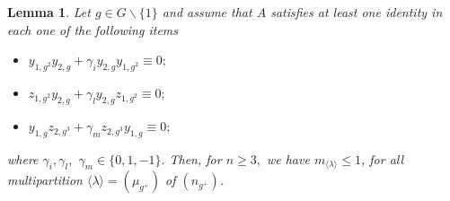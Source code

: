 \documentclass{amsart}
\newtheorem{lema}[teorema]{Lemma}
\numberwithin{equation}{section}
\begin{document}
\begin{lema}\label{lema2F} 
 Let $g\in G\backslash \{1\}$  and assume that $A$ satisfies at least one identity in each one of the following items
	\begin{itemize}
		\item[1)]$y_{1,g^2}y_{2,g}+\gamma_{i} y_{2,g}y_{1,g^2}\equiv 0;$
		
		\item[2)]$z_{1,g^2}y_{2,g}+\gamma_{l} y_{2,g}z_{1,g^2} \equiv 0;$
		
		\item[3)] $y_{1,g}z_{2,g^3}+\gamma_{m} z_{2,g^3}y_{1,g}\equiv 0;$
		
	\end{itemize} where $\gamma_{i}, \gamma_{l},$ $\gamma_{m} \in\{ 0,1,-1\}.$ Then, for $n\geq 3,$ we have $m_{\langle \lambda \rangle}\le 1$, for all multipartition $\langle \lambda \rangle=(\mu_{g^+})$ of  $(n_{g^+})$.
\end{lema} 
\end{document}
